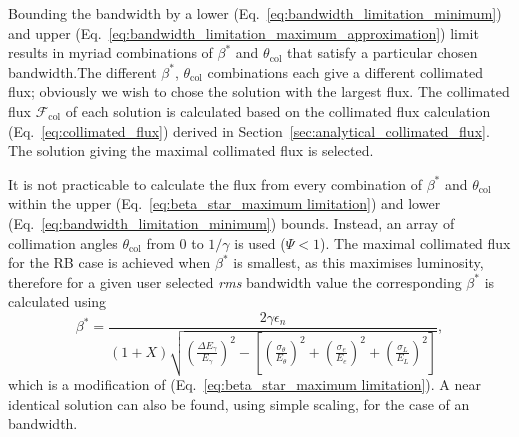 \documentclass[../main.tex]{subfiles}
\begin{document}
Bounding the  bandwidth by a lower (Eq.~\ref{eq:bandwidth_limitation_minimum}) and upper (Eq.~\ref{eq:bandwidth_limitation_maximum_approximation}) limit results in myriad combinations of $\beta^{*}$ and $\theta_{\mathrm{col}}$ that satisfy a particular chosen bandwidth.The different $\beta^{*}$, $\theta_{\mathrm{col}}$ combinations each give a different collimated flux; obviously we wish to chose the solution with the largest flux. The collimated flux $\mathcal{F}_{\mathrm{col}}$ of each solution is calculated based on the collimated flux calculation (Eq.~\ref{eq:collimated_flux}) derived in Section~\ref{sec:analytical_collimated_flux}. The solution giving the maximal collimated flux is selected. 

It is not practicable to calculate the flux from every combination of $\beta^{*}$ and $\theta_{\mathrm{col}}$ within the upper (Eq.~\ref{eq:beta_star_maximum limitation}) and lower (Eq.~\ref{eq:bandwidth_limitation_minimum}) bounds. Instead, an array of collimation angles $\theta_{\mathrm{col}}$ from 0 to $1/\gamma$ is used ($\Psi<1$). The maximal collimated flux for the RB case is achieved when $\beta^{*}$ is smallest, as this maximises luminosity, therefore for a given user selected \textit{rms} bandwidth value the corresponding $\beta^{*}$ is calculated using
\begin{equation}
\beta^{*} = \frac{2\gamma\epsilon_{n}}{\left(1+X\right)\sqrt{\left(\frac{\Delta E_{\gamma}}{E_{\gamma}}\right)^{2}-\left[\left(\frac{\sigma_{\theta}}{E_{\theta}}\right)^{2}+\left(\frac{\sigma_{e}}{E_{e}}\right)^{2}+\left(\frac{\sigma_{L}}{E_{L}}\right)^{2}\right]}},
\label{eq:beta_star_round_beam}
\end{equation}
which is a modification of (Eq.~\ref{eq:beta_star_maximum limitation}). A near identical solution can also be found, using simple scaling, for the case of an  bandwidth. 
\end{document}
